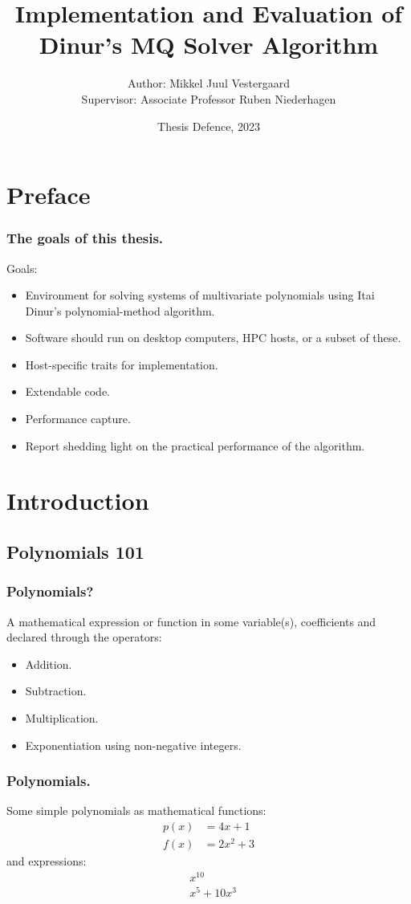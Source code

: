 \documentclass{beamer}
\title{Implementation and Evaluation of Dinur's MQ Solver Algorithm}
\author{Author: Mikkel Juul Vestergaard\\Supervisor: Associate Professor Ruben Niederhagen}
\institute{Department of Mathematics and Computer Science\\University of Southern Denmark}
\date{Thesis Defence, 2023}
\begin{document}
\frame{\titlepage}

\section{Preface}
\begin{frame}
    \frametitle{The goals of this thesis.}
    Goals:
    \begin{itemize}
        \item Environment for solving systems of multivariate polynomials using Itai Dinur's polynomial-method algorithm.
        \item Software should run on desktop computers, HPC hosts, or a subset of these.
        \item Host-specific traits for implementation.
        \item Extendable code.
        \item Performance capture.
        \item Report shedding light on the practical performance of the algorithm.
    \end{itemize}
\end{frame}

\section{Introduction}
\subsection{Polynomials 101}
\begin{frame}
    \frametitle{Polynomials?}
    A mathematical expression or function in some variable(s), coefficients and declared through the operators:
    \begin{itemize}
        \item Addition.
        \item Subtraction.
        \item Multiplication.
        \item Exponentiation using non-negative integers.
    \end{itemize}
\end{frame}

\begin{frame}
    \frametitle{Polynomials.}
    Some simple polynomials as mathematical functions:
    \begin{equation*}
        \begin{split}
            p(x) &= 4x + 1\\
            f(x) &= 2x^2 + 3
        \end{split}
    \end{equation*}
    and expressions:
    \begin{equation*}
        \begin{split}
            &x^{10}\\
            &x^5 + 10x^3
        \end{split}
    \end{equation*}

\end{frame}
\end{document}
